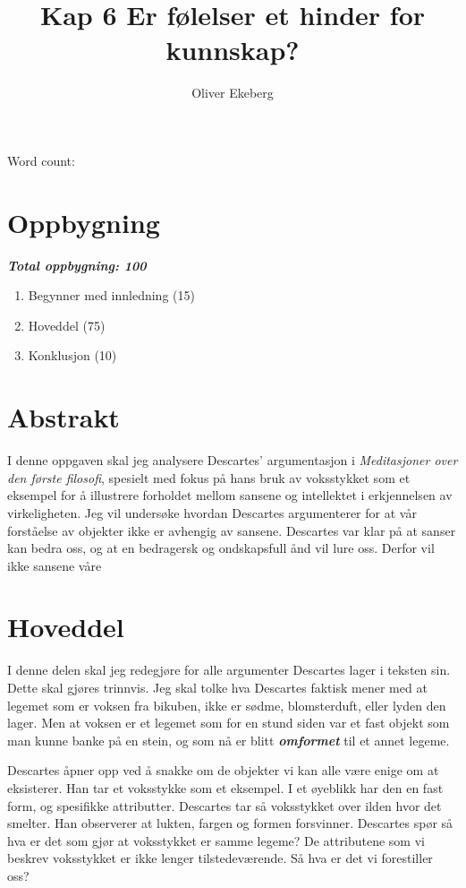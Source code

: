 \documentclass[11pt, a4paper]{article}
\title{Kap 6 Er følelser et hinder for kunnskap?}
\author{Oliver Ekeberg}
\date{}
\begin{document}
\maketitle

Word count:

\tableofcontents


\section{Oppbygning}

\textbf{\textit{Total oppbygning: 100}}

\begin{enumerate}
    \item Begynner med innledning (15)
    \item Hoveddel (75)
    \item Konklusjon (10)
\end{enumerate}

\section{Abstrakt}



I denne oppgaven skal jeg analysere Descartes' argumentasjon i \textit{Meditasjoner over den første filosofi}, spesielt med fokus på hans bruk av voksstykket som et eksempel for å illustrere forholdet mellom sansene og intellektet i erkjennelsen av virkeligheten. Jeg vil undersøke hvordan Descartes argumenterer for at vår forståelse av objekter ikke er avhengig av sansene. Descartes var klar på at sanser kan bedra oss, og at en bedragersk og ondskapsfull ånd vil lure oss. Derfor vil ikke sansene våre 


\section{Hoveddel}

I denne delen skal jeg redegjøre for alle argumenter Descartes lager i teksten sin. Dette skal gjøres trinnvis.  
Jeg skal tolke hva Descartes faktisk mener med at legemet som er voksen fra bikuben, ikke er 
sødme, blomsterduft, eller lyden den lager. Men at voksen er et legemet som for en stund siden var et fast objekt 
som man kunne banke på en stein, og som nå er blitt \textbf{\textit{omformet}} til et annet legeme.


Descartes åpner opp ved å snakke om de objekter vi kan alle være enige om at eksisterer. Han tar et voksstykke som et eksempel. I et øyeblikk har den en fast form, og spesifikke attributter. Descartes tar så voksstykket over ilden hvor det smelter. Han observerer at lukten, fargen og formen forsvinner. Descartes spør så hva er det som gjør at voksstykket er samme legeme? De attributene som vi beskrev voksstykket er ikke lenger tilstedeværende. Så hva er det vi forestiller oss? 
\end{document}
